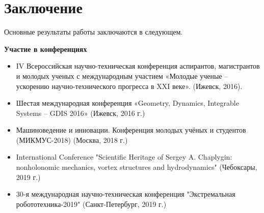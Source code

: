 \chapter*{Заключение}                       %


Основные результаты работы заключаются в следующем.


\textbf{Участие в конференциях}
\begin{itemize}
	\item IV Всероссийская научно-техническая конференция аспирантов, магистрантов и молодых ученых с международным участием «Молодые ученые -- ускорению научно-технического прогресса в XXI веке». (Ижевск, 2016).
	\item Шестая международная конференция «Geometry, Dynamics, Integrable Systems -- GDIS 2016» (Ижевск, 2016 г.)
	\item Машиноведение и инновации. Конференция молодых учёных и студентов (МИКМУС-2018) (Москва, 2018 г.)
	\item International Conference "Scientific Heritage of Sergey A. Chaplygin: nonholonomic mechanics, vortex structures and hydrodynamics" (Чебоксары, 2019 г.)
	\item 30-я международная научно-техническая конференция "Экстремальная робототехника-2019" (Санкт-Петербург, 2019 г.)	
\end{itemize}

